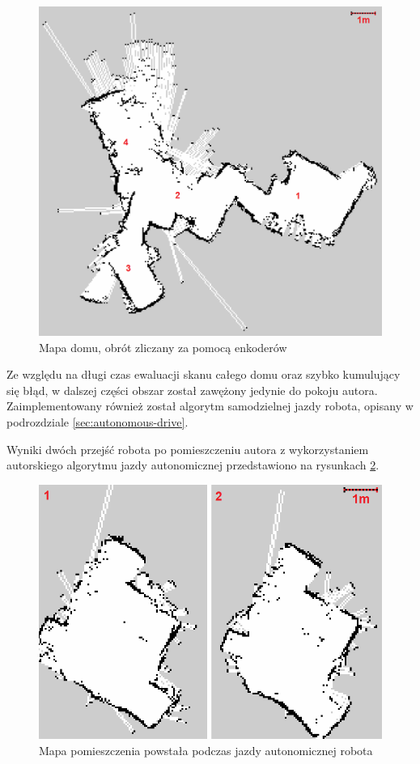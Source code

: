 \begin{figure}[H]
	\centering
		\includegraphics[width=0.8\linewidth]{rys/saved-map-2-encoder-only-cropped-upscaled-path-withscale.png}
	\caption{Mapa domu, obrót zliczany za pomocą enkoderów}
	\label{fig:encoder-only-run-first}
\end{figure}

Ze względu na długi czas ewaluacji skanu całego domu oraz szybko kumulujący się błąd, w dalszej części obszar został zawężony jedynie do pokoju autora. Zaimplementowany również został algorytm samodzielnej jazdy robota, opisany w podrozdziale \ref{sec:autonomous-drive}.

Wyniki dwóch przejść robota po pomieszczeniu autora z wykorzystaniem autorskiego algorytmu jazdy autonomicznej przedstawiono na rysunkach \ref{fig:final-scans}.


\begin{figure}[H]
	\centering
		\includegraphics[width=1\linewidth]{rys/saved-map-final-1and2-cropped-upscaled-withscale.png}
	\caption{Mapa pomieszczenia powstała podczas jazdy autonomicznej robota}
    \label{fig:final-scans}
\end{figure}